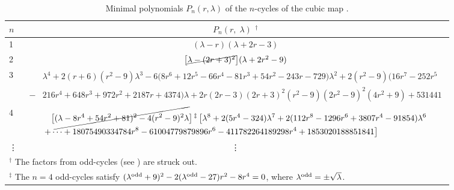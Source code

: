 \documentclass[twocolumn]{revtex4-1}
\begin{document}
\begin{table*}[t]\footnotesize
  \caption{
  Minimal polynomials $P_n(r, \lambda)$ of
  the $n$-cycles of the cubic map .
  }
\begin{center}
\begin{tabular}{lc}
\hline
  $n$
& $P_n(r, \; \lambda)$ $^\dagger$
\\
\hline
1
&
$(\lambda - r) (\lambda + 2 r - 3)$
\\
2
&
  $
  \big[
  \cancel{\lambda - (2r+3)^2}
  \big]
  (\lambda + 2r^2 - 9)
  $
\\
3
&
$\begin{aligned}
  &\lambda^4
  + 2 (r+6)(r^2-9) \lambda^3
  -6 \big(8 r^6+12 r^5-66 r^4-81 r^3+54 r^2-243 r-729\big)
  \lambda^2
+2 (r^2-9) \big(16 r^7-252 r^5\\
-&216 r^4 +648 r^3+972 r^2+2187 r+4374\big) \lambda
+2 r (2r-3) (2 r+3)^2 (r^2-9) (2 r^2 - 9)^2 (4 r^2+9) + 531441
\end{aligned}$
\\
4
&
\begin{minipage}{.97\linewidth}
\vspace*{1mm}
$\begin{aligned}
&\big[ \cancel{
  (\lambda-8r^4+54r^2+81)^2
-4 (r^2-9)^2 \lambda
} \big]
\,^\ddagger\,
\big[
\lambda^8
+2(5 r^4-324) \lambda^7
+2(112 r^8-1296 r^6+3807 r^4-91854) \lambda^6 \\
+&\dots
+18075490334784 r^8
-61004779879896 r^6
-411782264189298 r^4
+1853020188851841
\big]
\end{aligned}$
\end{minipage}
\\
\vdots & \vdots
\\
\hline
\multicolumn{2}{p{\textwidth}}{
$^\dagger$
The factors from odd-cycles (see {oddcycle}) are struck out.
}\\
\multicolumn{2}{p{\textwidth}}{
$^\ddagger$
The $n = 4$ odd-cycles satisfy
$(\lambda^{\mathrm{odd}} + 9)^2 - 2(\lambda^{\mathrm{odd}}-27) r^2 - 8 r^4 = 0$,
  where $\lambda^{\mathrm{odd}}=\pm\sqrt\lambda$.
} \\
\hline
\end{tabular}
\end{center}
\label{tab:cubpolygen}
\end{table*}
\end{document}
